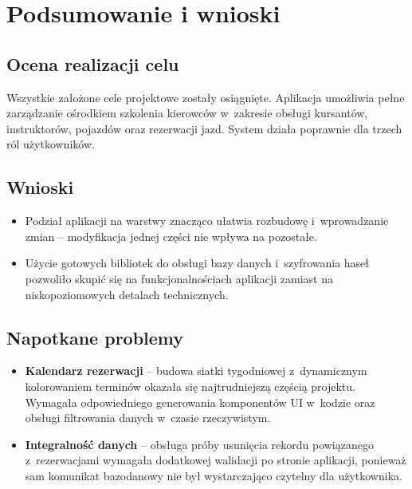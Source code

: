 \chapter{Podsumowanie i wnioski}
\label{ch:podsumowanie}

\section{Ocena realizacji celu}

Wszystkie za\l{}o\.{z}one cele projektowe zosta\l{}y osi\k{a}gni\k{e}te.
Aplikacja umo\.{z}liwia pe\l{}ne zarz\k{a}dzanie o\'{s}rodkiem szkolenia
kierowc\'{o}w w~zakresie obs\l{}ugi kursant\'{o}w, instruktor\'{o}w,
pojazd\'{o}w oraz rezerwacji jazd. System dzia\l{}a poprawnie dla trzech r\'{o}l
u\.{z}ytkownik\'{o}w.

\section{Wnioski}

\begin{itemize}
  \item Podzia\l{} aplikacji na warstwy znacz\k{a}co u\l{}atwia rozbudow\k{e}
        i~wprowadzanie zmian -- modyfikacja jednej cz\k{e}\'{s}ci nie wp\l{}ywa
        na pozosta\l{}e.
  \item U\.{z}ycie gotowych bibliotek do obs\l{}ugi bazy danych i~szyfrowania hase\l{}
        pozwoli\l{}o skupi\'{c} si\k{e} na funkcjonalno\'{s}ciach aplikacji zamiast
        na niskopoziomowych detalach technicznych.
\end{itemize}

\section{Napotkane problemy}

\begin{itemize}
  \item \textbf{Kalendarz rezerwacji} -- budowa siatki tygodniowej z~dynamicznym
        kolorowaniem termin\'{o}w okaza\l{}a si\k{e} najtrudniejsz\k{a} cz\k{e}\'{s}ci\k{a}
        projektu. Wymaga\l{}a odpowiedniego generowania komponent\'{o}w UI w~kodzie
        oraz obs\l{}ugi filtrowania danych w~czasie rzeczywistym.
  \item \textbf{Integralno\'{s}\'{c} danych} -- obs\l{}uga pr\'{o}by usuni\k{e}cia
        rekordu powi\k{a}zanego z~rezerwacjami wymaga\l{}a dodatkowej walidacji
        po stronie aplikacji, poniewa\.{z} sam komunikat bazodanowy nie by\l{}
        wystarczaj\k{a}co czytelny dla u\.{z}ytkownika.
\end{itemize}

